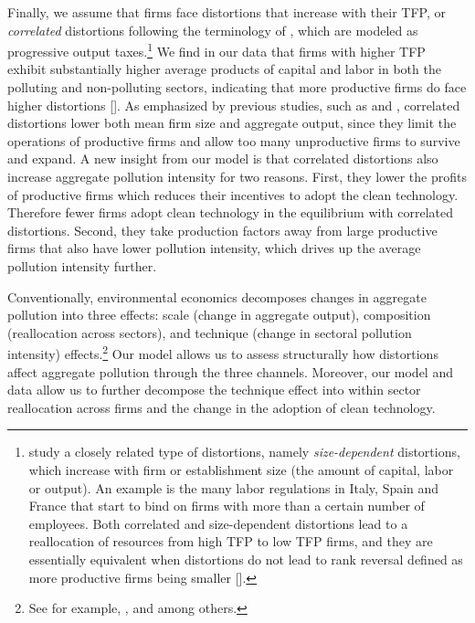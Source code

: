 \documentclass[AEJ]{AEA}
\begin{document}
Finally, we assume that firms face distortions that increase with their TFP, or \textit{correlated} distortions following the terminology of \citet{RestucciaRogerson:2008}, which are modeled as progressive output taxes.\footnote{\citet{Guneretal:2008} study a closely related type of distortions, namely \textit{size-dependent} distortions, which increase with firm or establishment size (the amount of capital, labor or output). An example is the many labor regulations in Italy, Spain and France that start to bind on firms with more than a certain number of employees. Both correlated and size-dependent distortions lead to a reallocation of resources from high TFP to low TFP firms, and they are essentially equivalent when distortions do not lead to rank reversal defined as more productive firms being smaller [\citet{Hopenhayn:2014}].} We find in our data that firms with higher TFP exhibit substantially higher average products of capital and labor in both the polluting and non-polluting sectors, indicating that more productive firms do face higher distortions [\citet{HsiehKlenow:2009, HsiehKlenow:2014}]. As emphasized by previous studies, such as \citet{RestucciaRogerson:2008} and \citet{HsiehKlenow:2014}, correlated distortions lower both mean firm size and aggregate output, since they limit the operations of productive firms and allow too many unproductive firms to survive and expand. A new insight from our model is that correlated distortions also increase aggregate pollution intensity for two reasons. First, they lower the profits of productive firms which reduces their incentives to adopt the clean technology. Therefore fewer firms adopt clean technology in the equilibrium with correlated distortions. Second, they take production factors away from large productive firms that also have lower pollution intensity, which drives up the average pollution intensity further.

Conventionally, environmental economics decomposes changes in aggregate pollution into three effects: scale (change in aggregate output), composition (reallocation across sectors), and technique (change in sectoral pollution intensity) effects.\footnote{See for example, \citet{GrossmanKrueger:1993}, \citet{CopelandTaylor:2004} and \citet{Levinson:2009} among others.} Our model allows us to assess structurally how distortions affect aggregate pollution through the three channels. Moreover, our model and data allow us to further decompose the technique effect into within sector reallocation across firms and the change in the adoption of clean technology.
\end{document}
